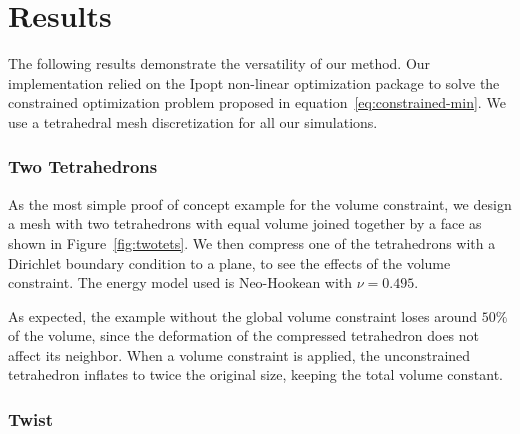 \chapter{Results}
\label{ch:Results}

The following results demonstrate the versatility of our method. Our implementation relied on the
Ipopt non-linear optimization package \cite{Wachter:2006} to solve the constrained optimization
problem proposed in equation~\eqref{eq:constrained-min}.  We use a tetrahedral mesh discretization for
all our simulations.

\subsection{Two Tetrahedrons}

As the most simple proof of concept example for the volume constraint, we design a mesh with two
tetrahedrons with equal volume joined together by a face as shown in Figure~\ref{fig:twotets}. We
then compress one of the tetrahedrons with a Dirichlet boundary condition to a plane, to see the
effects of the volume constraint. The energy model used is Neo-Hookean with $\nu = 0.495$. 

As expected, the example without the global volume constraint loses around $50\%$ of the volume,
since the deformation of the compressed tetrahedron does not affect its neighbor.
When a volume constraint is applied, the unconstrained tetrahedron inflates to twice the original
size, keeping the total volume constant. 


\subsection{Twist}

